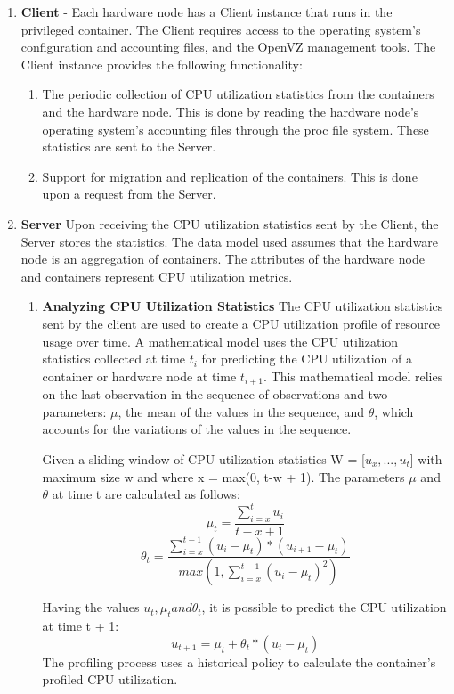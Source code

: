 \documentclass[conference]{IEEEtran}
\begin{document}
\begin{enumerate}
\item{\textbf{Client}} - Each hardware node has a Client instance that runs in the privileged container. The Client requires access to the operating system’s configuration and accounting files, and the OpenVZ management tools. The Client instance provides
the following functionality:
\begin{enumerate}
\item{The periodic collection of CPU utilization statistics from the containers and the hardware node. This is done by reading the hardware node’s
operating system’s accounting files through the proc file system. These statistics are sent to the Server.}
\item{Support for migration and replication of the containers. This is done upon a request from the Server.}
\end{enumerate}
\item{\textbf{Server}} Upon receiving the CPU utilization statistics sent by the Client, the Server stores the statistics. The data model used assumes that the hardware node is an aggregation of containers. The attributes of the hardware node and containers represent CPU utilization metrics. 
\begin{enumerate}
\item{\textbf{Analyzing CPU Utilization Statistics}} The CPU utilization statistics sent by the client are used to create a CPU utilization profile of resource usage over time. A mathematical
model uses the CPU utilization statistics collected at time $t_i$ for predicting the CPU utilization of a container or hardware node at time $t_{i+1}$.
This mathematical model relies on the last observation in the sequence of observations and two parameters: $\mu$, the mean of the values in the sequence, and $\theta$, which accounts for the variations of the values in the sequence. 

Given a sliding window of CPU utilization statistics W = [$u_x, ..., u_t$] with maximum size w and where x = max(0, t-w + 1). The parameters $\mu$ and $\theta$ at time t are calculated as
follows:
$$\mu_t = \frac{\sum_{i=x}^{t}u_i}{t-x+1}$$
$$\theta_t = \frac{\sum_{i=x}^{t-1}(u_i -\mu_t)\ast(u_{i+1}-\mu_t)}{max(1,\sum_{i=x}^{t-1}(u_i-\mu_t)^{2})}$$

Having the values $u_t, \mu_t and \theta_t$, it is possible to predict
the CPU utilization at time t + 1:
$$u_{t+1} = \mu_t + \theta_t * (u_t - \mu_t)$$
The profiling process uses a historical policy to calculate the container’s profiled CPU utilization. 


\end{enumerate}
\end{enumerate}
\end{document}
